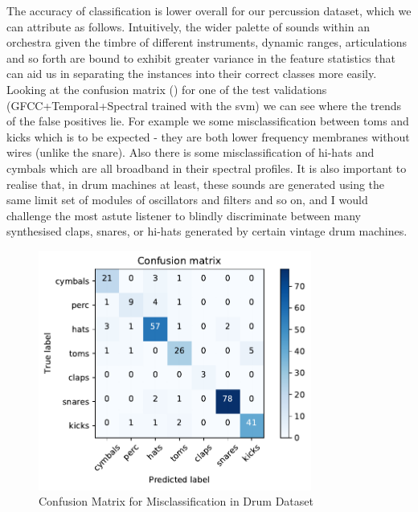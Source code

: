 {{{{{{{The accuracy of classification is lower overall for our percussion dataset, which we can attribute as follows. Intuitively, the wider palette of sounds within an orchestra given the timbre of different instruments, dynamic ranges, articulations and so forth are bound to exhibit greater variance in the feature statistics that can aid us in separating the instances into their correct classes more easily. Looking at the confusion matrix () for one of the test validations (GFCC+Temporal+Spectral trained with the \acrshort{svm}) we can see where the trends of the false positives lie. For example we some misclassification between toms and kicks which is to be expected - they are both lower frequency membranes without wires (unlike the snare). Also there is some misclassification of hi-hats and cymbals which are all broadband in their spectral profiles. It is also important to realise that, in drum machines at least, these sounds are generated using the same limit set of modules of oscillators and filters and so on, and I would challenge the most astute listener to blindly discriminate between many synthesised claps, snares, or hi-hats generated by  certain vintage drum machines.

\begin{figure}
	\begin{center}
		\includegraphics[width=0.8\textwidth]{ch05_pyconcat/figures/drum_confusion.pdf}
	\end{center}
	\caption[Confusion Matrix for Misclassification in Drum Dataset]{Confusion Matrix for Misclassification in Drum Dataset}
	\label{fig:drum_confusion}
\end{figure}

}}}}}}}

